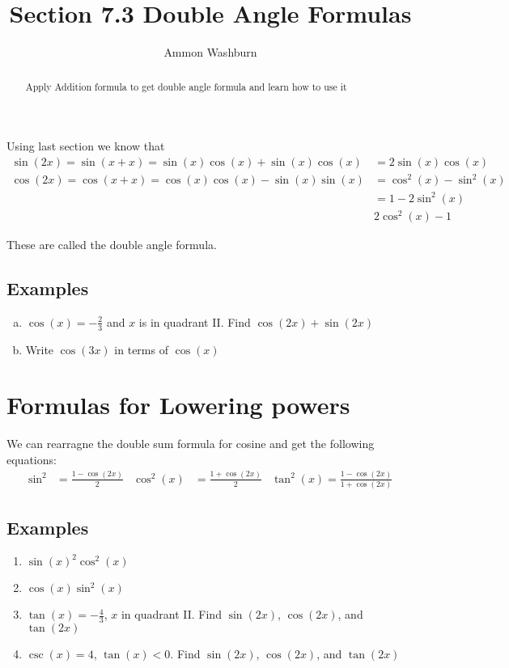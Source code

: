 \documentclass{tufte-handout}
\title{Section 7.3 Double Angle Formulas}
\author[AW]{Ammon Washburn}
\begin{document}
\maketitle

\begin{abstract}
Apply Addition formula to get double angle formula and learn how to use it
\end{abstract}

Using last section we know that
\begin{align*}
\sin(2x) = \sin(x+x) = \sin(x)\cos(x) + \sin(x)\cos(x) & = 2\sin(x)\cos(x) \\
\cos(2x) = \cos(x+x) = \cos(x)\cos(x) - \sin(x)\sin(x) & = \cos^2(x) - \sin^2(x) \\
& = 1 - 2\sin^2(x) \\
&2\cos^2(x) -1
\end{align*}

These are called the double angle formula.

\subsection{Examples}
\begin{enumerate}[(a)]
\item $\cos(x) = -\frac{2}{3}$ and $x$ is in quadrant II. Find $\cos(2x)+\sin(2x)$
\item Write $\cos(3x)$ in terms of $\cos(x)$
\end{enumerate}

\section{Formulas for Lowering powers}
We can rearragne the double sum formula for cosine and get the following equations:
\begin{align*}
\sin^2 & = \frac{1-\cos(2x)}{2} & \cos^2(x) & = \frac{1 + \cos(2x)}{2} & \tan^2(x) = \frac{1-\cos(2x)}{1+\cos(2x)}
\end{align*}
\subsection{Examples}
\begin{enumerate}
\item $\sin(x)^2\cos^2(x)$
\item $\cos(x)\sin^2(x)$
\item $\tan(x) = -\frac{4}{3}$, $x$ in quadrant II. Find $\sin(2x)$, $\cos(2x)$, and $\tan(2x)$
\item $\csc(x) = 4$, $\tan(x) < 0$. Find $\sin(2x)$, $\cos(2x)$, and $\tan(2x)$
\end{enumerate}
\end{document}

